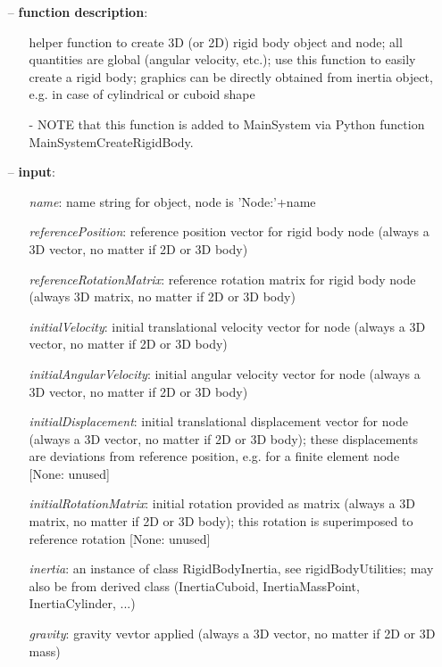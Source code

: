 \begin{itemize}[leftmargin=0.7cm]
\item[--]
{\bf function description}: \vspace{-6pt}
\begin{itemize}[leftmargin=1.2cm]
\setlength{\itemindent}{-0.7cm}
\item[]helper function to create 3D (or 2D) rigid body object and node; all quantities are global (angular velocity, etc.); use this function to easily create a rigid body; graphics can be directly obtained from inertia object, e.g. in case of cylindrical or cuboid shape
\item[]- NOTE that this function is added to MainSystem via Python function MainSystemCreateRigidBody.
\end{itemize}
\item[--]
{\bf input}: \vspace{-6pt}
\begin{itemize}[leftmargin=1.2cm]
\setlength{\itemindent}{-0.7cm}
\item[]{\it name}: name string for object, node is 'Node:'+name
\item[]{\it referencePosition}: reference position vector for rigid body node (always a 3D vector, no matter if 2D or 3D body)
\item[]{\it referenceRotationMatrix}: reference rotation matrix for rigid body node (always 3D matrix, no matter if 2D or 3D body)
\item[]{\it initialVelocity}: initial translational velocity vector for node (always a 3D vector, no matter if 2D or 3D body)
\item[]{\it initialAngularVelocity}: initial angular velocity vector for node (always a 3D vector, no matter if 2D or 3D body)
\item[]{\it initialDisplacement}: initial translational displacement vector for node (always a 3D vector, no matter if 2D or 3D body); these displacements are deviations from reference position, e.g. for a finite element node [None: unused]
\item[]{\it initialRotationMatrix}: initial rotation provided as matrix (always a 3D matrix, no matter if 2D or 3D body); this rotation is superimposed to reference rotation [None: unused]
\item[]{\it inertia}: an instance of class RigidBodyInertia, see rigidBodyUtilities; may also be from derived class (InertiaCuboid, InertiaMassPoint, InertiaCylinder, ...)
\item[]{\it gravity}: gravity vevtor applied (always a 3D vector, no matter if 2D or 3D mass)

\end{itemize}
\end{itemize}
